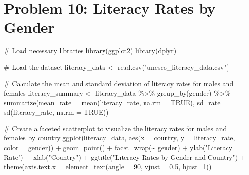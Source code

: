 \documentclass[
  letterpaper,
  DIV=11,
  numbers=noendperiod]{scrreprt}
\newenvironment{Shaded}{\begin{snugshade}}{\end{snugshade}}
\newcommand{\AttributeTok}[1]{\textcolor[rgb]{0.40,0.45,0.13}{#1}}
\newcommand{\CommentTok}[1]{\textcolor[rgb]{0.37,0.37,0.37}{#1}}
\newcommand{\ConstantTok}[1]{\textcolor[rgb]{0.56,0.35,0.01}{#1}}
\newcommand{\DecValTok}[1]{\textcolor[rgb]{0.68,0.00,0.00}{#1}}
\newcommand{\FloatTok}[1]{\textcolor[rgb]{0.68,0.00,0.00}{#1}}
\newcommand{\FunctionTok}[1]{\textcolor[rgb]{0.28,0.35,0.67}{#1}}
\newcommand{\NormalTok}[1]{\textcolor[rgb]{0.00,0.23,0.31}{#1}}
\newcommand{\OtherTok}[1]{\textcolor[rgb]{0.00,0.23,0.31}{#1}}
\newcommand{\SpecialCharTok}[1]{\textcolor[rgb]{0.37,0.37,0.37}{#1}}
\newcommand{\StringTok}[1]{\textcolor[rgb]{0.13,0.47,0.30}{#1}}
\begin{document}
\section*{Problem 10: Literacy Rates by
Gender}\label{problem-10-literacy-rates-by-gender-1}


\begin{Shaded}
\begin{Highlighting}[]
\CommentTok{\# Load necessary libraries}
\FunctionTok{library}\NormalTok{(ggplot2)}
\FunctionTok{library}\NormalTok{(dplyr)}

\CommentTok{\# Load the dataset}
\NormalTok{literacy\_data }\OtherTok{\textless{}{-}} \FunctionTok{read.csv}\NormalTok{(}\StringTok{"unesco\_literacy\_data.csv"}\NormalTok{)}

\CommentTok{\# Calculate the mean and standard deviation of literacy rates for males and females}
\NormalTok{literacy\_summary }\OtherTok{\textless{}{-}}\NormalTok{ literacy\_data }\SpecialCharTok{\%\textgreater{}\%}
  \FunctionTok{group\_by}\NormalTok{(gender) }\SpecialCharTok{\%\textgreater{}\%}
  \FunctionTok{summarize}\NormalTok{(}\AttributeTok{mean\_rate =} \FunctionTok{mean}\NormalTok{(literacy\_rate, }\AttributeTok{na.rm =} \ConstantTok{TRUE}\NormalTok{),}
            \AttributeTok{sd\_rate =} \FunctionTok{sd}\NormalTok{(literacy\_rate, }\AttributeTok{na.rm =} \ConstantTok{TRUE}\NormalTok{))}

\CommentTok{\# Create a faceted scatterplot to visualize the literacy rates for males and females by country}
\FunctionTok{ggplot}\NormalTok{(literacy\_data, }\FunctionTok{aes}\NormalTok{(}\AttributeTok{x =}\NormalTok{ country, }\AttributeTok{y =}\NormalTok{ literacy\_rate, }\AttributeTok{color =}\NormalTok{ gender)) }\SpecialCharTok{+}
  \FunctionTok{geom\_point}\NormalTok{() }\SpecialCharTok{+}
  \FunctionTok{facet\_wrap}\NormalTok{(}\SpecialCharTok{\textasciitilde{}}\NormalTok{ gender) }\SpecialCharTok{+}
  \FunctionTok{ylab}\NormalTok{(}\StringTok{"Literacy Rate"}\NormalTok{) }\SpecialCharTok{+} \FunctionTok{xlab}\NormalTok{(}\StringTok{"Country"}\NormalTok{) }\SpecialCharTok{+} 
  \FunctionTok{ggtitle}\NormalTok{(}\StringTok{"Literacy Rates by Gender and Country"}\NormalTok{) }\SpecialCharTok{+}
  \FunctionTok{theme}\NormalTok{(}\AttributeTok{axis.text.x =} \FunctionTok{element\_text}\NormalTok{(}\AttributeTok{angle =} \DecValTok{90}\NormalTok{, }\AttributeTok{vjust =} \FloatTok{0.5}\NormalTok{, }\AttributeTok{hjust=}\DecValTok{1}\NormalTok{))}


\end{Highlighting}
\end{Shaded}
\end{document}
